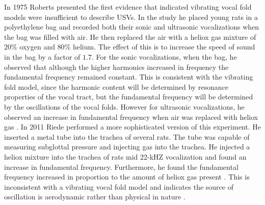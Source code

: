 \documentclass[12pt, letter]{report}
\begin{document}
In 1975 Roberts presented the first evidence that indicated vibrating vocal fold models were insufficient to describe USVs. In the study he placed young rats in a polyethylene bag and recorded both their sonic and ultrasonic vocalizations when the bag was filled with air. He then replaced the air with a heliox gas mixture of $20\%$ oxygen and $80\%$ helium. The effect of this is to increase the speed of sound in the bag by a factor of $1.7$. For the sonic vocalizations, when the bag, he observed that although the higher harmonics increased in frequency the fundamental frequency remained constant. This is consistent with the vibrating fold model, since the harmonic content will be determined by resonance properties of the vocal tract, but the fundamental frequency will be determined by the oscillations of the vocal folds. However for ultrasonic vocalizations, he observed an increase in fundamental frequency when air was replaced with heliox gas \cite{Roberts1975}. In 2011 Riede performed a more sophisticated version of this experiment. He inserted a metal tube into the trachea of several rats. The tube was capable of measuring subglottal pressure and injecting gas into the trachea. He injected a heliox mixture into the trachea of rats mid 22-kHZ vocalization and found an increase in fundamental frequency. Furthermore, he found the fundamental frequency increased in proportion to the amount of heliox gas present \cite{Riede2011}. 
This is inconsistent with a vibrating vocal fold model and indicates the source of oscillation is aerodynamic rather than physical in nature .



\end{document}
